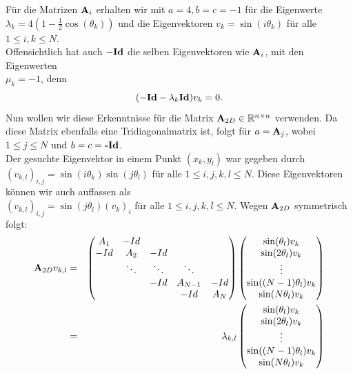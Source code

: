 Für die Matrizen ${\textbf{A}}_{i}$ erhalten wir mit $a = 4, b = c = -1$ für die Eigenwerte \\$\lambda_{k} = 4 (1 - \frac{1}{2} \cos(\theta_{k}))$ und die Eigenvektoren $v_{k} = \sin(i\theta_{k})$ für alle $1 \le i,k \le N$.\\
Offensichtlich hat auch $-{\textbf{Id}}$ die selben Eigenvektoren wie ${\textbf{A}}_{i}$, mit den Eigenwerten \\$\mu_{k} = -1$, denn
\begin{equation}
(-{\textbf{Id}} - \lambda_{k}{\textbf{Id}}) v_{k} = 0.
\end{equation}
Nun wollen wir diese Erkenntnisse für die Matrix ${\textbf{A}}_{2D} \in \mathbb{R}^{n \times n}$ verwenden. Da diese Matrix ebenfalls eine Tridiagonalmatrix ist, folgt für $a = {\textbf{A}}_{j}$, wobei $1 \le j \le N$ und $b = c = {\textbf{-Id}}$.\\
Der gesuchte Eigenvektor in einem Punkt $(x_{k},y_{l})$ war gegeben durch $(v_{k,l})_{i,j} = \sin(i\theta_{k}) \sin(j\theta_{l})$ für alle $1 \le i,j,k,l \le N$. Diese Eigenvektoren können wir auch auffassen als \\$(v_{k,l})_{i,j} = \sin(j\theta_{l})(v_{k})_{i}$ für alle $1 \le i,j,k,l \le N$. Wegen ${\textbf{A}}_{2D}$ symmetrisch folgt:
\begin{eqnarray}
{\textbf{A}}_{2D}v_{k,l} &=& 
\begin{pmatrix}
A_{1} & -Id\\
-Id & A_{2} & -Id\\
    & \ddots & \ddots & \ddots\\
   	&		 & -Id    & A_{N-1} & -Id\\
   	&		 &		  & -Id    & A_{N}
\end{pmatrix}
\begin{pmatrix}
\sin(\theta_{l}) v_{k}\\
\sin(2\theta_{l}) v_{k}\\
\vdots\\
\sin((N-1)\theta_{l}) v_{k}\\
\sin(N\theta_{l}) v_{k}\\
\end{pmatrix}\notag\\
&=& \lambda_{k,l}
\begin{pmatrix}
\sin(\theta_{l}) v_{k}\\
\sin(2\theta_{l}) v_{k}\\
\vdots\\
\sin((N-1)\theta_{l}) v_{k}\\
\sin(N\theta_{l}) v_{k}\\
\end{pmatrix}\notag
\end{eqnarray}

